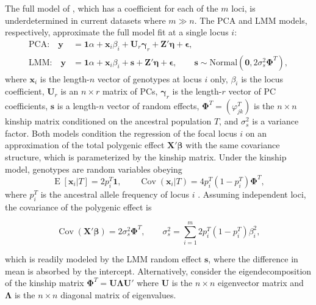 \documentclass[9pt,lineno]{elife}
\DeclareMathOperator{\E}{E}
\DeclareMathOperator{\Cov}{Cov}
\newcommand{\kt}[1][k]{\varphi_{j#1}^T}
\newcommand{\pit}{p_i^T}
\begin{document}
The full model of , which has a coefficient for each of the $m$ loci, is underdetermined in current datasets where $m \gg n$.
The PCA and LMM models, respectively, approximate the full model fit at a single locus $i$:
\begin{align}
  \label{eq:pca_gwas}
  \text{PCA:}\quad
  \mathbf{y}
  &=
    \mathbf{1} \alpha + \mathbf{x}_i \beta_i + \mathbf{U}_r \boldsymbol{\gamma}_r + \mathbf{Z}' \boldsymbol{\eta} + \boldsymbol{\epsilon}
    , \\
  \label{eq:lmm_gwas}
  \text{LMM:}\quad
  \mathbf{y}
  &=
    \mathbf{1} \alpha + \mathbf{x}_i \beta_i + \mathbf{s} + \mathbf{Z}' \boldsymbol{\eta} + \boldsymbol{\epsilon}
    ,
    \quad\quad
    \mathbf{s} \sim \text{Normal} \left( \mathbf{0}, 2 \sigma^2_s \mathbf{\Phi}^T \right),
\end{align}
where $\mathbf{x}_i$ is the length-$n$ vector of genotypes at locus $i$ only,
$\beta_i$ is the locus coefficient,
$\mathbf{U}_r$ is an $n \times r$ matrix of PCs,
$\boldsymbol{\gamma}_r$ is the length-$r$ vector of PC coefficients,
$\mathbf{s}$ is a length-$n$ vector of random effects,
$\mathbf{\Phi}^T = (\kt)$ is the $n \times n$ kinship matrix conditioned on the ancestral population $T$,
and $\sigma^2_s$ is a variance factor.
Both models condition the regression of the focal locus $i$ on an approximation of the total polygenic effect $\mathbf{X}' \boldsymbol{\beta}$ with the same covariance structure, which is parameterized by the kinship matrix.
Under the kinship model, genotypes are random variables obeying
\begin{equation}
  \label{eq:kinship_model}
  \E[ \mathbf{x}_i | T ]
  =
  2 \pit \mathbf{1},
  \quad\quad
  \Cov( \mathbf{x}_i | T )
  =
  4 \pit ( 1 - \pit ) \mathbf{\Phi}^T,
\end{equation}
where $\pit$ is the ancestral allele frequency of locus $i$ \citep{malecot_mathematiques_1948, wright_genetical_1949, jacquard_structures_1970, astle_population_2009}.
Assuming independent loci, the covariance of the polygenic effect is
\begin{linenomath*}
  $$
  \Cov( \mathbf{X}' \boldsymbol{\beta} ) = 2 \sigma^2_s \mathbf{\Phi}^T,
  \quad\quad
  \sigma^2_s = \sum_{i=1}^m 2 \pit ( 1 - \pit ) \beta_i^2,
  $$
\end{linenomath*}
which is readily modeled by the LMM random effect $\mathbf{s}$, where the difference in mean is absorbed by the intercept.
Alternatively, consider the eigendecomposition of the kinship matrix $\mathbf{\Phi}^T = \mathbf{U} \mathbf{\Lambda} \mathbf{U}'$ where $\mathbf{U}$ is the $n \times n$ eigenvector matrix and $\mathbf{\Lambda}$ is the $n \times n$ diagonal matrix of eigenvalues.
\end{document}
